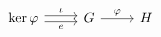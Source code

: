 \documentclass{article}
\begin{document}
    \begin{equation*}
        \begin{tikzcd}
            \ker\phi \ar[r, "\iota", shift left=0.5ex] \ar[r, "e"', shift right=0.5ex] & G \ar[r, "\phi"] & H
        \end{tikzcd}
    \end{equation*}
\end{document}
